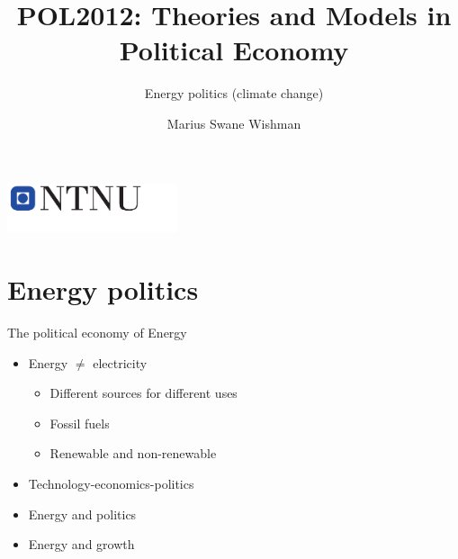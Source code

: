 \documentclass{beamer}
\title{POL2012: Theories and Models in Political Economy}
\subtitle{Energy politics (climate change)} %
\date{}
\author{Marius Swane Wishman}
\institute{Department of Sociology and Political Science}
\begin{document}
\begin{frame}[plain]
\titlepage %
\centering %
\includegraphics[width=5cm]{logo_ntnu_u-slagord.pdf}
\end{frame}

\section{Energy politics}

\begin{frame}{The political economy of Energy}
\begin{itemize}
    \item Energy $\neq$ electricity \pause
    \begin{itemize}
        \item Different sources for different uses
        \item Fossil fuels \pause
        \item Renewable and non-renewable \pause
    \end{itemize}{}
    \item Technology-economics-politics
    \item Energy and politics
    \item Energy and growth %
\end{itemize}{}
\end{frame}{}
\end{document}
